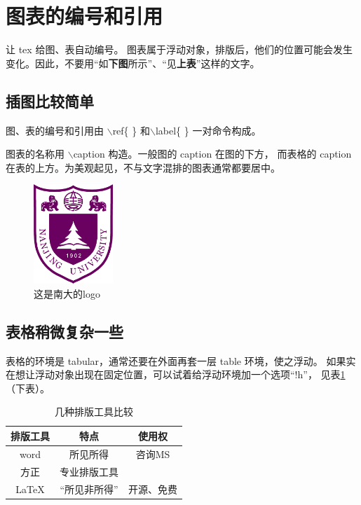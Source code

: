 \documentclass{article}
\begin{document}
\section{图表的编号和引用}
让 tex 给图、表自动编号。 图表属于浮动对象，排版后，他们的位置可能会发生
变化。因此，不要用``如\textbf{下图}所示''、``见\textbf{上表}''这样的文字。
\subsection{插图比较简单}
图、表的编号和引用由 $\backslash$ref\{ \} 和$\backslash$label\{ \}
一对命令构成。

图表的名称用 $\backslash$caption 构造。一般图的 caption 在图的下方，
而表格的 caption 在表的上方。为美观起见，不与文字混排的图表通常都要居中。

\begin{figure}
\centering   %
\includegraphics[width=3cm]{njulogo.pdf}
\caption{这是南大的logo} \label{njulogo}
\end{figure}

\subsection{表格稍微复杂一些}
表格的环境是 tabular，通常还要在外面再套一层 table 环境，使之浮动。
如果实在想让浮动对象出现在固定位置，可以试着给浮动环境加一个选项``!h''，
见表\ref{pub_tools}（下表）。

\begin{table}[!h]
\centering
\caption{几种排版工具比较}  \label{pub_tools}
\begin{tabular}{c|c|c}
    \hline
  排版工具 & 特点 & 使用权   \\ \hline
   word    & 所见所得 & 咨询MS \\
    方正    & 专业排版工具 &   \\
   LaTeX   &  ``所见非所得'' & 开源、免费\\ \hline
\end{tabular}
\end{table}
\end{document}
